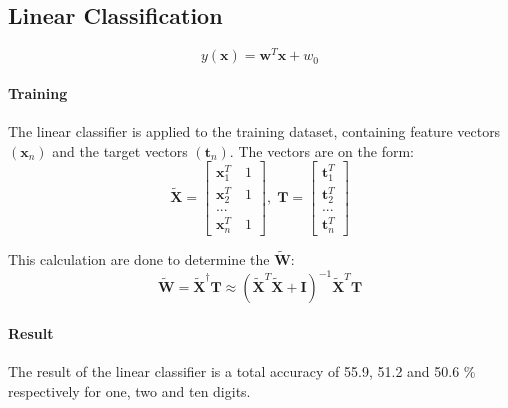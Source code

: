 \subsection*{Linear Classification}

\begin{equation}
y(\mathbf{x}) = \mathbf{w}^T \mathbf{x}+w_0
\label{eq:lin_output}
\end{equation}

\paragraph*{Training}
The linear classifier is applied to the training dataset, containing feature vectors $(\mathbf{x}_n)$ and the target vectors $(\mathbf{t}_n)$.
The vectors are on the form:
\begin{equation}
\mathbf{\tilde{X}}=\left[ \begin{array}{c}\mathbf{x}_1^T \quad 1\\
\mathbf{x}_2^T \quad 1\\
...\\ 
\mathbf{x}_n^T \quad 1 \end{array} \right],
\;
\mathbf{T}=\left[ \begin{array}{c}
\mathbf{t}_1^T\\ 
\mathbf{t}_2^T\\ 
...\\
\mathbf{t}_n^T
\end{array} \right]
\label{eq:linearVectors}  
\end{equation} 

This calculation are done to determine the $\tilde{\mathbf{W}}$:
\begin{equation}
\tilde{\mathbf{W}} = \tilde{\mathbf{X}}^\dagger \mathbf{T} \approx  (\tilde{\mathbf{X}}^T \tilde{\mathbf{X}}+\mathbf{I})^{-1} \tilde{\mathbf{X}}^T\mathbf{T}
\label{eq:weightVector}  
\end{equation}

\paragraph*{Result}
The result of the linear classifier is a total accuracy of 55.9, 51.2 and 50.6 \% respectively for one, two and ten digits. 
